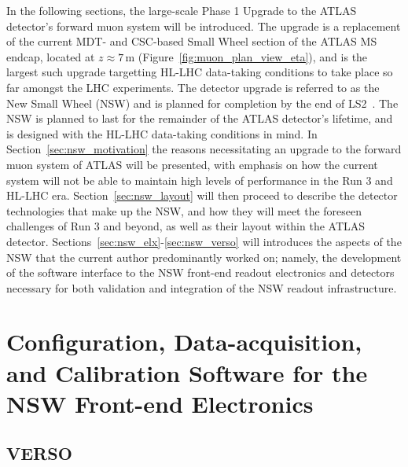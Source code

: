 In the following sections, the large-scale Phase 1 Upgrade to the ATLAS detector's forward muon system
will be introduced.
The upgrade is a replacement of the current MDT- and CSC-based Small Wheel section of the ATLAS MS endcap, located at $z \approx 7$\,m (Figure~\ref{fig:muon_plan_view_eta}),
and is the largest such upgrade targetting HL-LHC data-taking conditions to take place so far amongst the LHC experiments.
The detector upgrade is referred to as the New Small Wheel (NSW) and is planned for completion by
the end of LS2~\cite{NSWTDR}.
The NSW is planned to last for the remainder of the ATLAS detector's lifetime, and is designed with the
HL-LHC data-taking conditions in mind.
In Section~\ref{sec:nsw_motivation} the reasons necessitating an upgrade to the forward muon system
of ATLAS will be presented, with emphasis on how the current system will not be able to maintain high
levels of performance in the Run 3 and HL-LHC era.
Section~\ref{sec:nsw_layout} will then proceed to describe the detector technologies that make up
the NSW, and how they will meet the foreseen challenges of Run 3 and beyond, as well as their layout
within the ATLAS detector.
Sections~\ref{sec:nsw_elx}-\ref{sec:nsw_verso} will introduces the aspects of the NSW that the
current author predominantly worked on; namely, the development of the software interface to the NSW front-end readout
electronics and detectors necessary for both validation and integration of the NSW readout infrastructure.




\FloatBarrier


\FloatBarrier

\section{Configuration, Data-acquisition, and Calibration Software for the NSW Front-end Electronics}
\subsection{VERSO}
